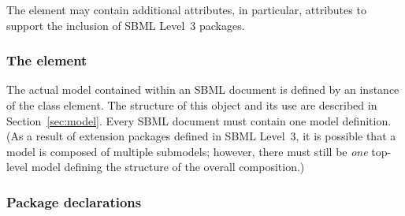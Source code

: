 The  element may contain additional attributes, in
particular, attributes to support the inclusion of SBML Level~3
packages.


\subsubsection{The  element}

The actual model contained within an SBML document is defined by
an instance of the \Model class element.  The structure of this
object and its use are described in Section~\ref{sec:model}.
Every SBML document must contain one model definition.  (As a
result of extension packages defined in SBML Level~3, it is
possible that a model is composed of multiple submodels; however,
there must still be \emph{one} top-level model defining the
structure of the overall composition.)


\subsubsection{Package declarations}
\label{sec:sbml-packages}


